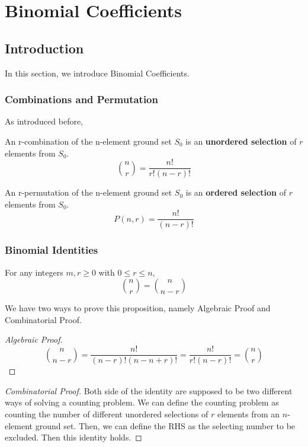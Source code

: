 \chapter{Binomial Coefficients}

\section{Introduction}
In this section, we introduce Binomial Coefficients.

\subsection{Combinations and Permutation}
As introduced before,
\begin{definition} An r-combination of the n-element ground set $S_0$ is an \textbf{unordered selection} of $r$ elements from $S_0$. 
\[
	\binom{n}{r} = \dfrac{n!}{r!(n-r)!}
\]
\end{definition}

\begin{definition} An r-permutation of the n-element ground set $S_0$ is an \textbf{ordered selection} of $r$ elements from $S_0$. 
	\[
	P(n,r) = \dfrac{n!}{(n-r)!}
	\]
\end{definition}

\subsection{Binomial Identities}
\begin{proposition} For any integers \(m, r \geq 0\) with \(0 \leq r \leq n\),
	\[
		\binom{n}{r} = \binom{n}{n - r}
	\]
\end{proposition}

We have two ways to prove this proposition, namely Algebraic Proof and Combinatorial Proof.

\begin{proof}[Algebraic Proof]
	\[
		\binom{n}{n-r} = \dfrac{n!}{(n-r)!(n-n+r)!} = \dfrac{n!}{r!(n-r)!} = \binom{n}{r}
	\]
\end{proof}

\begin{proof}[Combinatorial Proof]
	Both side of the identity are supposed to be two different ways of solving a counting problem. We can define the counting problem as counting the number of different unordered selections of \(r\) elements from an \(n\)-element ground set. Then, we can define the RHS as the selecting number to be excluded. Then this identity holds.  
\end{proof}

